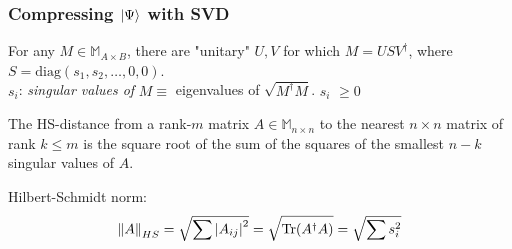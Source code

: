 \documentclass{beamer}
\theoremstyle{definition}
\begin{document}
\begin{frame}
	\frametitle{Compressing $\ket{\Psi}$ with SVD}
	
	\begin{theorem}
		For any $M \in \mathbb{M}_{A\times B}$, there are "unitary" $U,V$ for which  $M = U S V^\dagger$, where $S = \text{diag}(s_1,s_2,\dots,0,0)$.\\
		\vspace{5pt}
		$s_i$: \textit{singular values of} $M \equiv$  eigenvalues of $\sqrt{M^\dagger M }$. $s_i$ $\geq 0$
	\end{theorem}
	
	
	\begin{theorem}
		The HS-distance from a rank-$m$ matrix $A\in \mathbb{M}_{n\times n}$ to the nearest $n\times n$ matrix of rank $k \leq m$ is the square root of the sum of the squares of the smallest $n-k$ singular values of $A$.
	\end{theorem}

	Hilbert-Schmidt norm:
	\begin{align*}
		\norm{A}_{HS} = \sqrt{\sum \abs{A_{ij}}^2} =  \sqrt{\Tr(A^\dagger A)} = \sqrt{\sum s_i^2}
	\end{align*} 
	
\end{frame}
\end{document}
